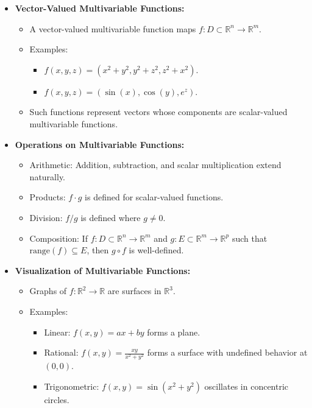 \documentclass{article}
\begin{document}
\begin{itemize}
  \item \textbf{Vector-Valued Multivariable Functions:}
    \begin{itemize}
      \item A vector-valued multivariable function maps $f: D \subset \mathbb{R}^n \to \mathbb{R}^m$.
      \item Examples:
        \begin{itemize}
          \item $f(x, y, z) = (x^2 + y^2, y^2 + z^2, z^2 + x^2)$.
          \item $f(x, y, z) = (\sin(x), \cos(y), e^z)$.
        \end{itemize}
      \item Such functions represent vectors whose components are scalar-valued multivariable functions.
    \end{itemize}

  \item \textbf{Operations on Multivariable Functions:}
    \begin{itemize}
      \item Arithmetic: Addition, subtraction, and scalar multiplication extend naturally.
      \item Products: $f \cdot g$ is defined for scalar-valued functions.
      \item Division: $f / g$ is defined where $g \neq 0$.
      \item Composition: If $f: D \subset \mathbb{R}^n \to \mathbb{R}^m$ and $g: E \subset \mathbb{R}^m \to \mathbb{R}^p$ such that $\text{range}(f) \subseteq E$, then $g \circ f$ is well-defined.
    \end{itemize}

  \item \textbf{Visualization of Multivariable Functions:}
    \begin{itemize}
      \item Graphs of $f: \mathbb{R}^2 \to \mathbb{R}$ are surfaces in $\mathbb{R}^3$.
      \item Examples:
        \begin{itemize}
          \item Linear: $f(x, y) = ax + by$ forms a plane.
          \item Rational: $f(x, y) = \frac{xy}{x^2 + y^2}$ forms a surface with undefined behavior at $(0, 0)$.
          \item Trigonometric: $f(x, y) = \sin(x^2 + y^2)$ oscillates in concentric circles.
        \end{itemize}
    \end{itemize}


\end{itemize}
\end{document}
